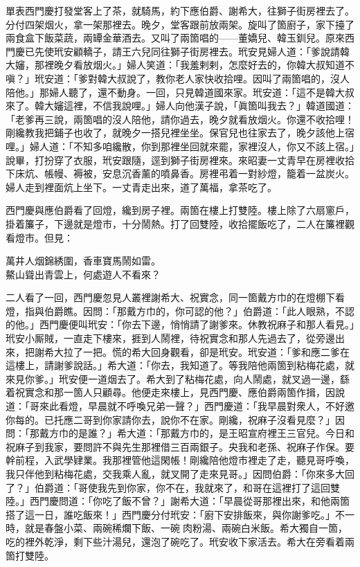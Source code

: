 單表西門慶打發堂客上了茶，就騎馬，約下應伯爵、謝希大，往獅子街房裡去了。分付四架烟火，拿一架那裡去。晚夕，堂客跟前放兩架。旋叫了箇廚子，家下擡了兩食盒下飯菜蔬，兩罈金華酒去。又叫了兩箇唱的——董嬌兒、韓玉釧兒。原來西門慶已先使玳安顧轎子，請王六兒同往獅子街房裡去。玳安見婦人道：「爹說請韓大嬸，那裡晚夕看放烟火。」婦人笑道：「我羞剌剌，怎麼好去的，你韓大叔知道不嗔？」玳安道：「爹對韓大叔說了，教你老人家快收拾哩。因叫了兩箇唱的，沒人陪他。」那婦人聽了，還不動身。一回，只見韓道國來家。玳安道：「這不是韓大叔來了。韓大嬸這裡，不信我說哩。」婦人向他漢子說，「眞箇叫我去？」韓道國道：「老爹再三說，兩箇唱的沒人陪他，請你過去，晚夕就看放烟火。你還不收拾哩！剛纔教我把鋪子也收了，就晚夕一搭兒裡坐坐。保官兒也往家去了，晚夕該他上宿哩。」婦人道：「不知多咱纔散，你到那裡坐回就來罷，家裡沒人，你又不該上宿。」說畢，打扮穿了衣服，玳安跟隨，逕到獅子街房裡來。來昭妻一丈青早在房裡收拾下床炕、帳幔、褥被，安息沉香薰的噴鼻香。{}房裡弔着一對紗燈，籠着一盆炭火。婦人走到裡面炕上坐下。一丈青走出來，道了萬福，拿茶吃了。

西門慶與應伯爵看了回燈，纔到房子裡。兩箇在樓上打雙陸。樓上除了六扇窻戶，掛着簾子，下邊就是燈市，十分鬧熱。打了回雙陸，收拾擺飯吃了，二人在簾裡觀看燈市。但見：

\begin{myquote}
萬井人烟錦綉圍，香車寶馬鬧如雷。\\鰲山聳出青雲上，何處遊人不看來？
\end{myquote}

二人看了一回，西門慶忽見人叢裡謝希大、祝實念，同一箇戴方巾的在燈棚下看燈，指與伯爵瞧。因問：「那戴方巾的，你可認的他？」伯爵道：「此人眼熟，不認的他。」西門慶便叫玳安：「你去下邊，悄悄請了謝爹來。休教祝麻子和那人看見。」玳安小厮賊，一直走下樓來，捱到人鬧裡，待祝實念和那人先過去了，從旁邊出來，把謝希大拉了一把。慌的希大回身觀看，卻是玳安。玳安道：「爹和應二爹在這樓上，請謝爹說話。」希大道：「你去，我知道了。等我陪他兩箇到粘梅花處，就來見你爹。」玳安便一道烟去了。希大到了粘梅花處，向人鬧處，就叉過一邊，繇着祝實念和那一箇人只顧尋。他便走來樓上，{}見西門慶、應伯爵兩箇作揖，因說道：「哥來此看燈，早晨就不呼喚兄弟一聲？」西門慶道：「我早晨對衆人，不好邀你每的。已托應二哥到你家請你去，說你不在家。剛纔，祝麻子沒看見麼？」因問：「那戴方巾的是誰？」希大道：「那戴方巾的，是王昭宣府裡王三官兒。今日和祝麻子到我家，要問許不與先生那裡借三百兩銀子。央我和老孫、祝麻子作保。要幹前程，入武學肄業。我那裡管他這閑帳！剛纔陪他燈市裡走了走，聽見哥呼喚，我只伴他到粘梅花處，交我乘人亂，就叉開了走來見哥。」因問伯爵：「你來多大回了？」伯爵道：「哥使我先到你家，你不在，我就來了，和哥在這裡打了這回雙陸。」西門慶問道：「你吃了飯不曾？」謝希大道：「早晨從哥那裡出來，和他兩箇搭了這一日，誰吃飯來！」西門慶分付玳安：「廚下安排飯來，與你謝爹吃。」不一時，就是春盤小菜、兩碗稀爛下飯、一碗𤆑肉粉湯、兩碗白米飯。希大獨自一箇，吃的裡外乾淨，剩下些汁湯兒，還泡了碗吃了。玳安收下家活去。希大在旁看着兩箇打雙陸。

